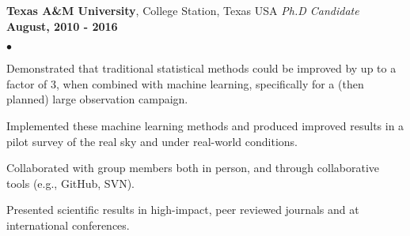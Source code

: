 \documentclass[margin,line, 11pt]{res}
\newenvironment{list2}{
  \begin{list}{$\bullet$}{%
      \setlength{\itemsep}{0in}
      \setlength{\parsep}{0in} \setlength{\parskip}{0in}
      \setlength{\topsep}{0in} \setlength{\partopsep}{0in}
      \setlength{\leftmargin}{0.2in}}}{\end{list}}
\begin{document}
\begin{resume}
\textbf{Texas A\&M University}, College Station, Texas USA\newline
\textit{Ph.D Candidate} \hfill \textbf{August, 2010 - 2016}\newline
    \begin{list2}
    	\vspace*{-5mm}
      \item Demonstrated that traditional statistical methods could be improved by up to a factor of 3, when combined with machine learning, specifically for a (then planned) large observation campaign.
      \item Implemented these machine learning methods and produced improved results in a pilot survey of the real sky and under real-world conditions.
    	\item Collaborated with group members both in person, and through collaborative tools (e.g., GitHub, SVN).
    	\item Presented scientific results in high-impact, peer reviewed journals and at international conferences.
    \end{list2}
\vspace*{-3mm}



\end{resume}
\end{document}
